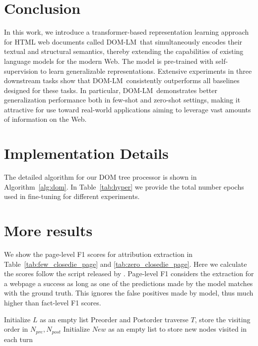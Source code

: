 \documentclass[sigconf, nonacm]{acmart}
\newcommand{\ours}[0]{DOM-LM}
\newcommand{\nop}[1]{}
\begin{document}
 \section{Conclusion}
In this work, we introduce a transformer-based representation learning approach for HTML web documents called \ours \ that simultaneously encodes their textual and structural semantics, thereby extending the capabilities of existing language models for the modern Web. The model is pre-trained with self-supervision to learn generalizable representations. Extensive experiments in three downstream tasks show that \ours \  consistently outperforms all baselines designed for these tasks. In particular, \ours \ demonstrates better generalization performance both in few-shot and zero-shot settings, making it attractive for use toward real-world applications aiming to leverage vast amounts of information on the Web. 






\clearpage
\appendix
\section{Implementation Details}
\label{app:detail}
The detailed algorithm for our DOM tree processor is shown in Algorithm~\ref{alg:dom}. In Table~\ref{tab:hyper} we provide the total number epochs used in fine-tuning for different experiments.
\section{More results}
\label{app:more_results}
We show the page-level F1 scores for attribution extraction in Table~\ref{tab:few_closedie_page} and \ref{tab:zero_closedie_page}. Here we calculate the scores follow the script released by \citet{zhou2021simplified}. Page-level F1 considers the extraction for a webpage a success as long as one of the predictions made by the model matches with the ground truth. This ignores the false positives made by model, thus much higher than fact-level F1 scores.

\begin{algorithm}[t]
\nop{Put comments for major snippets; otherwise can be hard to parse.}
\caption{DOM tree Processor to generate subtrees.}\label{alg:dom}
Initialize $L$ as an empty list\;
Preorder and Postorder traverse $T$, store the visiting order in $N_{pre}, N_{post}$\;
Initialize $New$ as an empty list to store new nodes visited in each turn\;
\end{algorithm}
\end{document}
